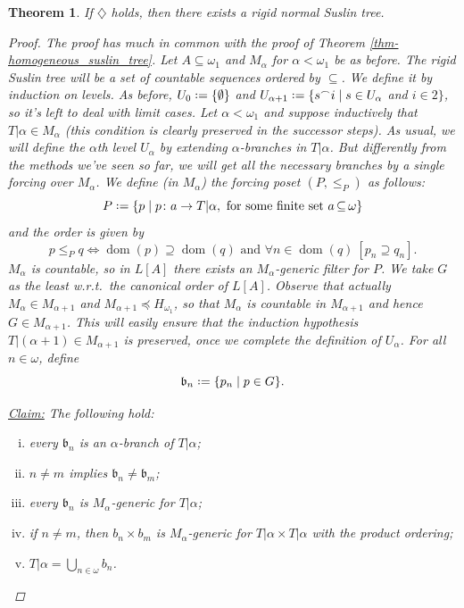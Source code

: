 \documentclass[11pt,a4paper]{report}
\newtheorem{theorem}{Theorem}[chapter] %
\theoremstyle{definition}
\theoremstyle{num.custom-title}
\theoremstyle{custom-title}
\newenvironment{claim}[1]{\par\noindent\underline{Claim#1:}\space}{} %
\DeclareMathOperator{\dom}{dom}
\DeclareMathOperator{\sse}{\subseteq}
\newcommand{\conc}{^\frown}
\newcommand*{\defeq}{\mathrel{\rlap{%
                     \raisebox{0.3ex}{$\cdot$}}%
                     \raisebox{-0.3ex}{$\cdot$}}%
                     =}
\begin{document}
\begin{theorem}
If $\diamondsuit$ holds, then there exists a rigid normal Suslin tree.
\begin{proof}
\renewcommand{\b}{\mathfrak{b}}
The proof has much in common with the proof of Theorem \ref{thm-homogeneous_suslin_tree}. Let $A \sse \omega_1$ and $M_\alpha$ for $\alpha < 	\omega_1$ be as before. The rigid Suslin tree will be a set of countable sequences ordered by $\sse$. We define it by induction on levels. As before, $U_0 \defeq \{\emptyset\}$ and $U_{\alpha+1} \defeq \{s \conc i \mid s \in U_\alpha$ and $i \in 2\}$, so it's left to deal with limit cases. Let $\alpha < \omega_1$ and suppose inductively that $T|\alpha \in M_\alpha$ (this condition is clearly preserved in the successor steps). As usual, we will define the $\alpha$th level $U_\alpha$ by extending $\alpha$-branches in $T|\alpha$. But differently from the methods we've seen so far, we will get \emph{all} the necessary branches by a single forcing over $M_\alpha$. We define (in $M_\alpha$) the forcing poset $(P,\leq_P)$ as follows:
\[
P \defeq \{ p \mid p \colon a \to T|\alpha, \text{ for some finite set $a \sse \omega$} \}
\]
and the order is given by
\[
p \leq_P q \Longleftrightarrow \dom(p) \supseteq \dom(q) \text{ and } \forall n \in \dom(q) \ [p_n \supseteq q_n].
\]
$M_\alpha$ is countable, so in $L[A]$ there exists an $M_\alpha$-generic filter for $P$. We take $G$ as the least w.r.t.\ the canonical order of $L[A]$. Observe that actually $M_\alpha \in M_{\alpha+1}$ and $M_{\alpha+1} \preceq H_{\omega_1}$, so that $M_\alpha$ is countable in $M_{\alpha+1}$ and hence $G \in M_{\alpha+1}$. This will easily ensure that the induction hypothesis $T|(\alpha+1) \in M_{\alpha+1}$ is preserved, once we complete the definition of $U_\alpha$. For all $n \in \omega$, define
\[
\b_n \defeq \{p_n \mid p \in G\}.
\]
\begin{claim}{}
The following hold:
\begin{enumerate}[(i)]
\item every $\b_n$ is an $\alpha$-branch of $T|\alpha$;
\item $n \neq m$ implies $\b_n \neq \b_m$;
\item every $\b_n$ is $M_\alpha$-generic for $T|\alpha$;
\item if $n \neq m$, then $b_n \times b_m$ is $M_\alpha$-generic for $T|\alpha \times T|\alpha$ with the product ordering;
\item $T|\alpha = \bigcup_{n \in \omega} b_n$.
\end{enumerate}

\end{claim}
\end{proof}
\end{theorem}
\end{document}
